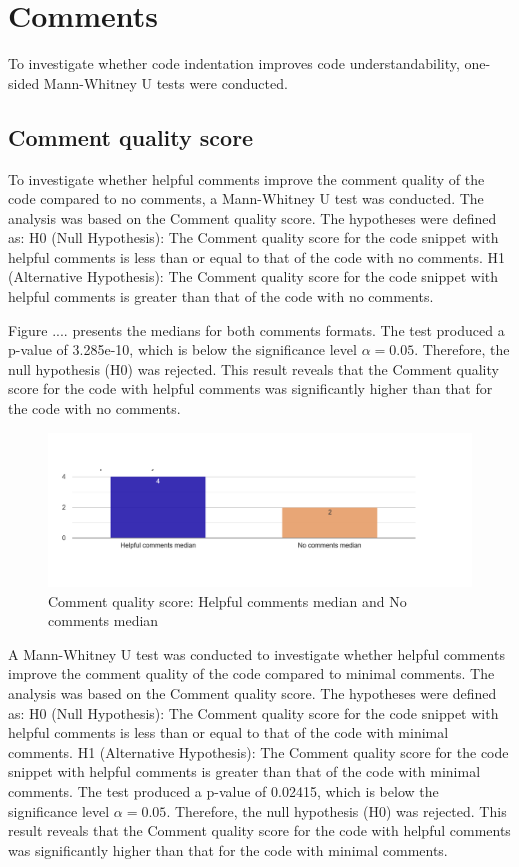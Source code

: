 \section{Comments}


To investigate whether code indentation improves code understandability, one-sided Mann-Whitney U tests were conducted. 

\subsection{Comment quality score}

To investigate whether helpful comments improve the comment quality of the code compared to no comments, a Mann-Whitney U test was conducted.  The analysis was based on the Comment quality score. The hypotheses were defined as: H0 (Null Hypothesis): The Comment quality score for the code snippet with helpful comments is less than or equal to that of the code with no comments.  H1 (Alternative Hypothesis): The Comment quality score for the code snippet with helpful comments is greater than that of the code with no comments.

Figure .... presents the medians for both comments formats.
The test produced a p-value of 3.285e-10, which is below the significance level $\alpha = 0.05$. Therefore, the null hypothesis (H0) was rejected. This result reveals that the Comment quality score for the code with helpful comments was significantly higher than that for the code with no comments.

\begin{figure} [H]
  \centering
  \includegraphics[scale=0.5]{figures/h-0-q4.png}
  \caption{Comment quality score: Helpful comments median and No comments median}
  \label{fig:AnhangsChor}
\end{figure}


A Mann-Whitney U test was conducted to investigate whether helpful comments improve the comment quality of the code compared to minimal comments. The analysis was based on the Comment quality score. The hypotheses were defined as: H0 (Null Hypothesis): The Comment quality score for the code snippet with helpful comments is less than or equal to that of the code with minimal comments.  H1 (Alternative Hypothesis): The Comment quality score for the code snippet with helpful comments is greater than that of the code with minimal comments. The test produced a p-value of 0.02415, which is below the significance level $\alpha = 0.05$. Therefore, the null hypothesis (H0) was rejected. This result reveals that the Comment quality score for the code with helpful comments was significantly higher than that for the code with minimal comments.






